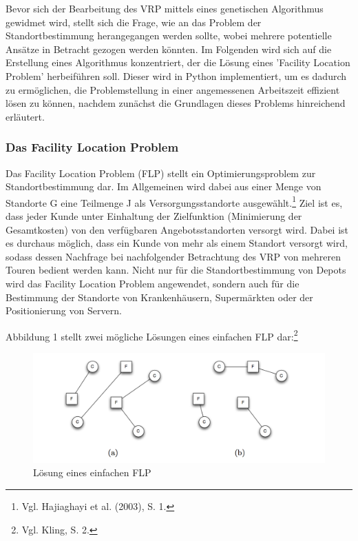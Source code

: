 \documentclass[a4paper,12pt,parskip,bibtotoc,liststotoc]{article}
\begin{document}
Bevor sich der Bearbeitung des VRP mittels eines genetischen Algorithmus gewidmet wird, stellt sich die Frage, wie an das Problem der Standortbestimmung herangegangen werden sollte, wobei mehrere potentielle Ansätze in Betracht gezogen werden könnten.
Im Folgenden wird sich auf die Erstellung eines Algorithmus konzentriert, der die Lösung eines 'Facility Location Problem' herbeiführen soll.
Dieser wird in Python implementiert, um es dadurch zu ermöglichen, die Problemstellung in einer angemessenen Arbeitszeit effizient lösen zu können, nachdem zunächst die Grundlagen dieses Problems hinreichend erläutert.

\subsubsection{Das Facility Location Problem}

Das Facility Location Problem (FLP) stellt ein Optimierungsproblem zur Standortbestimmung dar. Im Allgemeinen wird dabei aus einer Menge von Standorte G eine Teilmenge J als Versorgungsstandorte ausgewählt.\footnote{Vgl. Hajiaghayi et al. (2003), S. 1.}
Ziel ist es, dass jeder Kunde unter Einhaltung der Zielfunktion (Minimierung der Gesamtkosten) von den verfügbaren Angebotsstandorten versorgt wird.
Dabei ist es durchaus möglich, dass ein Kunde von mehr als einem Standort versorgt wird, sodass dessen Nachfrage bei nachfolgender Betrachtung des VRP von mehreren Touren bedient werden kann.
Nicht nur für die Standortbestimmung von Depots wird das Facility Location Problem angewendet, sondern auch für die Bestimmung der Standorte von Krankenhäusern, Supermärkten oder der Positionierung von Servern.

Abbildung 1 stellt zwei mögliche Lösungen eines einfachen FLP dar:\footnote{Vgl. Kling, S. 2.}

\begin{figure}[h!]
  \begin{center}
    \includegraphics[width=150mm]{FLP}
    \caption{Lösung eines einfachen FLP}  \label{Typen}
  \end{center}
\end{figure}
\end{document}
